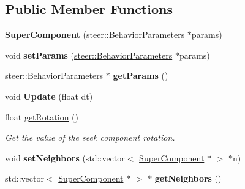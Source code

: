 \subsection*{Public Member Functions}
\begin{DoxyCompactItemize}
\item 
\hypertarget{classsteer_1_1_super_component_a68178cb95e90ba293dbadc23a4f3059c}{{\bfseries Super\-Component} (\hyperlink{structsteer_1_1_behavior_parameters}{steer\-::\-Behavior\-Parameters} $\ast$params)}\label{classsteer_1_1_super_component_a68178cb95e90ba293dbadc23a4f3059c}

\item 
\hypertarget{classsteer_1_1_super_component_a694aa0c8a460e55f6528469c5b0472fe}{void {\bfseries set\-Params} (\hyperlink{structsteer_1_1_behavior_parameters}{steer\-::\-Behavior\-Parameters} $\ast$params)}\label{classsteer_1_1_super_component_a694aa0c8a460e55f6528469c5b0472fe}

\item 
\hypertarget{classsteer_1_1_super_component_aa2c67084990f7bf55d2145d11a10c7b1}{\hyperlink{structsteer_1_1_behavior_parameters}{steer\-::\-Behavior\-Parameters} $\ast$ {\bfseries get\-Params} ()}\label{classsteer_1_1_super_component_aa2c67084990f7bf55d2145d11a10c7b1}

\item 
\hypertarget{classsteer_1_1_super_component_a33741a52ba737cf3e9cfd57b4a57aebd}{void {\bfseries Update} (float dt)}\label{classsteer_1_1_super_component_a33741a52ba737cf3e9cfd57b4a57aebd}

\item 
\hypertarget{classsteer_1_1_super_component_a41007b4652393a035e711e24020e7f4d}{float \hyperlink{classsteer_1_1_super_component_a41007b4652393a035e711e24020e7f4d}{get\-Rotation} ()}\label{classsteer_1_1_super_component_a41007b4652393a035e711e24020e7f4d}

\begin{DoxyCompactList}\small\item\em Get the value of the seek component rotation. \end{DoxyCompactList}\item 
\hypertarget{classsteer_1_1_super_component_a21670f6217c1146ecbe2e7f634191987}{void {\bfseries set\-Neighbors} (std\-::vector$<$ \hyperlink{classsteer_1_1_super_component}{Super\-Component} $\ast$ $>$ $\ast$n)}\label{classsteer_1_1_super_component_a21670f6217c1146ecbe2e7f634191987}

\item 
\hypertarget{classsteer_1_1_super_component_a979f008e0d633b227b86341866f86a82}{std\-::vector$<$ \hyperlink{classsteer_1_1_super_component}{Super\-Component} $\ast$ $>$ $\ast$ {\bfseries get\-Neighbors} ()}\label{classsteer_1_1_super_component_a979f008e0d633b227b86341866f86a82}


\end{DoxyCompactItemize}
